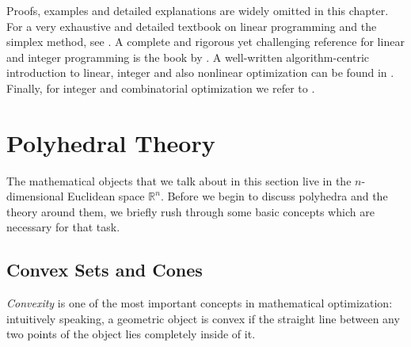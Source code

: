 Proofs, examples and detailed explanations are widely omitted in this chapter. For a very exhaustive and detailed textbook on linear programming and the simplex method, see \cite{Dantzig63LPandExtensions}. A complete and rigorous yet challenging reference for linear and integer programming is the book by \textcite{Schrijver86LinearIntegerProg}. A well-written algorithm-centric introduction to linear, integer and also nonlinear optimization can be found in \cite{Faigle+10AlgorithmicMathProg}. Finally, for integer and combinatorial optimization we refer to \cite{NemhauserWolsey88}.

\section{Polyhedral Theory}\label{sec:intro-poly}
The mathematical objects that we talk about in this section live in the $n$-dimensional Euclidean space $ℝ^n$. Before we begin to discuss polyhedra and the theory around them, we briefly rush through some basic concepts which are necessary for that task.

\subsection{Convex Sets and Cones}
\emph{Convexity} is one of the most important concepts in mathematical optimization: intuitively speaking, a geometric object is convex if the straight line between any two points of the object lies completely inside of it.

